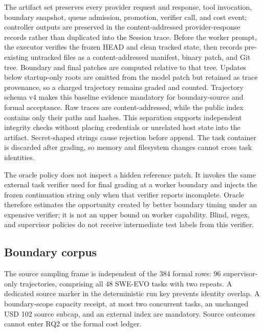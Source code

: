 \documentclass[sigconf,nonacm]{acmart}
\begin{document}
The artifact set preserves every provider request and response, tool invocation, boundary snapshot, queue admission, promotion, verifier call, and cost event; controller outputs are preserved in the content-addressed provider-response records rather than duplicated into the Session trace. Before the worker prompt, the executor verifies the frozen HEAD and clean tracked state, then records pre-existing untracked files as a content-addressed manifest, binary patch, and Git tree. Boundary and final patches are computed relative to that tree. Updates below startup-only roots are omitted from the model patch but retained as trace provenance, so a charged trajectory remains graded and counted. Trajectory schema v4 makes this baseline evidence mandatory for boundary-source and formal acceptance. Raw traces are content-addressed, while the public index contains only their paths and hashes. This separation supports independent integrity checks without placing credentials or unrelated host state into the artifact. Secret-shaped strings cause rejection before append. The task container is discarded after grading, so memory and filesystem changes cannot cross task identities.

The oracle policy does not inspect a hidden reference patch. It invokes the same external task verifier used for final grading at a worker boundary and injects the frozen continuation string only when that verifier reports incomplete. Oracle therefore estimates the opportunity created by better boundary timing under an expensive verifier; it is not an upper bound on worker capability. Blind, regex, and supervisor policies do not receive intermediate test labels from this verifier.

\subsection{Boundary corpus}
The source sampling frame is independent of the 384 formal rows: 96 supervisor-only trajectories, comprising all 48 SWE-EVO tasks with two repeats. A dedicated source marker in the deterministic run key prevents identity overlap. A boundary-scope capacity receipt, at most two concurrent tasks, an unchanged USD 102 source subcap, and an external  index are mandatory. Source outcomes cannot enter RQ2 or the formal cost ledger.
\end{document}
